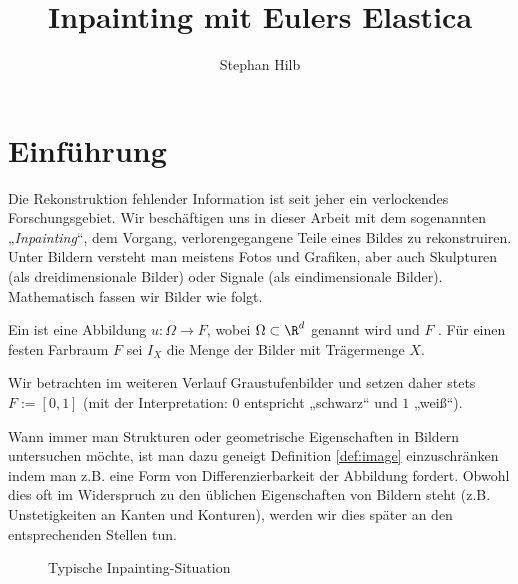 \documentclass{mythesis}
\title{Inpainting mit Eulers Elastica}
\author{Stephan Hilb}
\begin{document}


\chapter{Einführung}

%
%


Die Rekonstruktion fehlender Information ist seit jeher ein verlockendes Forschungsgebiet.
Wir beschäftigen uns in dieser Arbeit mit dem sogenannten „\emph{Inpainting}“, dem Vorgang, verlorengegangene Teile eines Bildes zu rekonstruiren.
Unter Bildern versteht man meistens Fotos und Grafiken, aber auch Skulpturen (als dreidimensionale Bilder) oder Signale (als eindimensionale Bilder).
Mathematisch fassen wir Bilder wie folgt.

\begin{definition} \label{def:image}
    Ein  ist eine Abbildung $u: \Omega \to F$, wobei $\Omega \subset \R^d$
     genannt wird und $F$ .
    Für einen festen Farbraum $F$ sei $I_X$ die Menge der Bilder mit Trägermenge $X$.
    \begin{note}
	Wir betrachten im weiteren Verlauf Graustufenbilder und setzen daher stets $F := [0,1]$ (mit der
	Interpretation: $0$ entspricht „schwarz“ und $1$ „weiß“).
    \end{note}
\end{definition}

Wann immer man Strukturen oder geometrische Eigenschaften in Bildern untersuchen möchte, ist man dazu geneigt Definition \ref{def:image} einzuschränken indem man z.B. eine Form von Differenzierbarkeit der Abbildung fordert.
Obwohl dies oft im Widerspruch zu den üblichen Eigenschaften von Bildern steht (z.B. Unstetigkeiten an Kanten und Konturen), werden wir dies später an den entsprechenden Stellen tun.

\begin{figure}[ht]
    \centering
    \caption{Typische Inpainting-Situation}
    \label{fig:inpainting_setting}
\end{figure}
\end{document}
